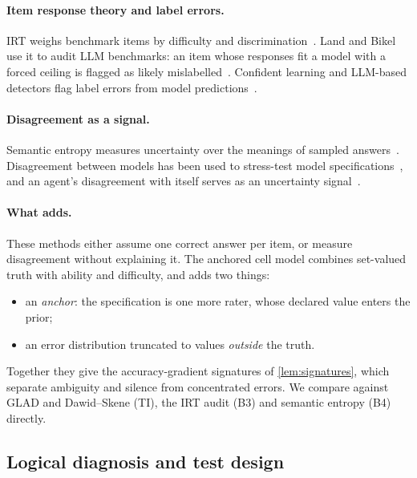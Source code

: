 \paragraph{Item response theory and label errors.} IRT weighs benchmark items by difficulty and discrimination~\cite{lalor2016building,rodriguez2021evaluation}. Land and Bikel use it to audit LLM benchmarks: an item whose responses fit a model with a forced ceiling is flagged as likely mislabelled~\cite{land2026auditing}. Confident learning and LLM-based detectors flag label errors from model predictions~\cite{northcutt2021confident,nahum2025llms,klie2023annotation}.

\paragraph{Disagreement as a signal.} Semantic entropy measures uncertainty over the meanings of sampled answers~\cite{kuhn2023semantic,farquhar2024detecting}. Disagreement between models has been used to stress-test model specifications~\cite{zhang2025stress}, and an agent's disagreement with itself serves as an uncertainty signal~\cite{mehta2026agents}.

\paragraph{What \specdx adds.} These methods either assume one correct answer per item, or measure disagreement without explaining it. The anchored cell model combines set-valued truth with ability and difficulty, and adds two things:
\begin{itemize}[leftmargin=*]
\item an \emph{anchor}: the specification is one more rater, whose declared value enters the prior;
\item an error distribution truncated to values \emph{outside} the truth.
\end{itemize}
Together they give the accuracy-gradient signatures of \cref{lem:signatures}, which separate ambiguity and silence from concentrated errors. We compare against GLAD and Dawid--Skene (TI), the IRT audit (B3) and semantic entropy (B4) directly.

\subsection{Logical diagnosis and test design}

